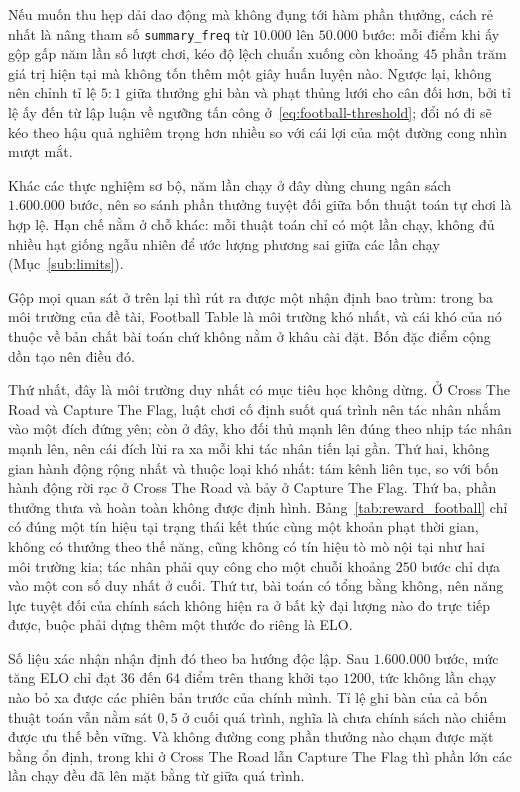\indent Nếu muốn thu hẹp dải dao động mà không đụng tới hàm phần thưởng, cách rẻ nhất là nâng
tham số \texttt{summary\_freq} từ $10.000$ lên $50.000$ bước: mỗi điểm khi ấy gộp gấp năm lần
số lượt chơi, kéo độ lệch chuẩn xuống còn khoảng $45$ phần trăm giá trị hiện tại mà không tốn
thêm một giây huấn luyện nào. Ngược lại, không nên chỉnh tỉ lệ $5{:}1$ giữa thưởng ghi bàn và
phạt thủng lưới cho cân đối hơn, bởi tỉ lệ ấy đến từ lập luận về ngưỡng tấn công
ở~\eqref{eq:football-threshold}; đổi nó đi sẽ kéo theo hậu quả nghiêm trọng hơn nhiều so với
cái lợi của một đường cong nhìn mượt mắt.

\indent Khác các thực nghiệm sơ bộ, năm lần chạy ở đây dùng chung ngân sách $1.600.000$ bước,
nên so sánh phần thưởng tuyệt đối giữa bốn thuật toán tự chơi là hợp lệ.
Hạn chế nằm ở chỗ khác: mỗi thuật toán chỉ có một lần chạy, không đủ nhiều hạt giống ngẫu
nhiên để ước lượng phương sai giữa các lần chạy (Mục~\ref{sub:limits}).

\indent Gộp mọi quan sát ở trên lại thì rút ra được một nhận định bao trùm: trong ba môi
trường của đề tài, Football Table là môi trường khó nhất, và cái khó của nó thuộc về bản chất
bài toán chứ không nằm ở khâu cài đặt. Bốn đặc điểm cộng dồn tạo nên điều đó.

\indent Thứ nhất, đây là môi trường duy nhất có mục tiêu học không dừng. Ở Cross The Road và
Capture The Flag, luật chơi cố định suốt quá trình nên tác nhân nhắm vào một đích đứng yên;
còn ở đây, kho đối thủ mạnh lên đúng theo nhịp tác nhân mạnh lên, nên cái đích lùi ra xa mỗi
khi tác nhân tiến lại gần. Thứ hai, không gian hành động rộng nhất và thuộc loại khó nhất:
tám kênh liên tục, so với bốn hành động rời rạc ở Cross The Road và bảy ở Capture The Flag.
Thứ ba, phần thưởng thưa và hoàn toàn không được định hình. Bảng~\ref{tab:reward_football}
chỉ có đúng một tín hiệu tại trạng thái kết thúc cùng một khoản phạt thời gian, không có
thưởng theo thế năng, cũng không có tín hiệu tò mò nội tại như hai môi trường kia; tác nhân
phải quy công cho một chuỗi khoảng $250$ bước chỉ dựa vào một con số duy nhất ở cuối. Thứ tư,
bài toán có tổng bằng không, nên năng lực tuyệt đối của chính sách không hiện ra ở bất kỳ đại
lượng nào đo trực tiếp được, buộc phải dựng thêm một thước đo riêng là ELO.

\indent Số liệu xác nhận nhận định đó theo ba hướng độc lập. Sau $1.600.000$ bước, mức tăng
ELO chỉ đạt $36$ đến $64$ điểm trên thang khởi tạo $1200$, tức không lần chạy nào bỏ xa được
các phiên bản trước của chính mình. Tỉ lệ ghi bàn của cả bốn thuật toán vẫn nằm sát $0{,}5$ ở
cuối quá trình, nghĩa là chưa chính sách nào chiếm được ưu thế bền vững. Và không đường cong
phần thưởng nào chạm được mặt bằng ổn định, trong khi ở Cross The Road lẫn Capture The Flag
thì phần lớn các lần chạy đều đã lên mặt bằng từ giữa quá trình.

